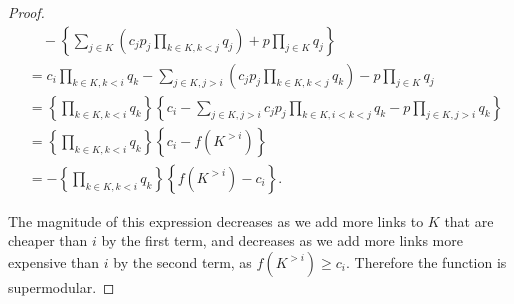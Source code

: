 \documentclass[10pt,a4paper]{amsart}
\begin{document}
\begin{proof}
\begin{align*}
    &\quad-\left\{\sum_{j\in K}\left( c_j p_j \prod_{k\in K, k<j}q_j\right) + p \prod_{j\in K}q_j\right\}\\
    &= c_i\prod_{k\in K, k < i}q_k - \sum_{j\in K, j > i}\left( c_j p_j \prod_{k\in K, k<j}q_k\right) - p\prod_{j\in K}q_j\\
    &= \left\{\prod_{k\in K, k < i}q_k\right\}\left\{ c_i - \sum_{j\in K, j > i}c_j p_j \prod_{k\in K, i < k < j}q_k - p\prod_{j\in K, j > i}q_k\right\}\\
    &= \left\{\prod_{k\in K, k < i}q_k\right\}\left\{c_i - f(K^{>i})\right\}\\
    &=-\left\{\prod_{k\in K, k < i}q_k\right\}\left\{f(K^{>i}) - c_i\right\}.
\end{align*}

The magnitude of this expression decreases as we add more links to $K$ that are cheaper than $i$ by the first term, and decreases as we add more links more expensive than $i$ by the second term, as $f(K^{>i}) \geq c_i$. Therefore the function is supermodular. 
\end{proof}
\end{document}
